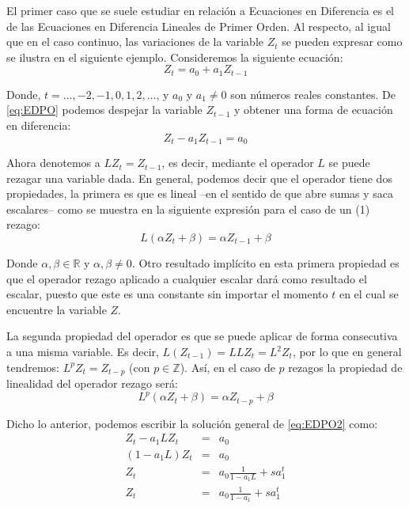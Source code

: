 \documentclass[
]{book}
\begin{document}
El primer caso que se suele estudiar en relación a Ecuaciones en Diferencia es el de las Ecuaciones en Diferencia Lineales de Primer Orden. Al respecto, al igual que en el caso continuo, las variaciones de la variable \(Z_t\) se pueden expresar como se ilustra en el siguiente ejemplo. Consideremos la siguiente ecuación:
\begin{equation}
    Z_t = a_0 + a_1 Z_{t-1}
    \label{eq:EDPO}
\end{equation}

Donde, \(t = \ldots, -2, -1, 0, 1, 2, \ldots\), y \(a_0\) y \(a_1 \neq 0\) son números reales constantes. De \eqref{eq:EDPO} podemos despejar la variable \(Z_{t-1}\) y obtener una forma de ecuación en diferencia:
\begin{equation}
    Z_t - a_1 Z_{t-1} = a_0
    \label{eq:EDPO2}
\end{equation}

Ahora denotemos a \(L Z_t = Z_{t-1}\), es decir, mediante el operador \(L\) se puede rezagar una variable dada. En general, podemos decir que el operador tiene dos propiedades, la primera es que es lineal --en el sentido de que abre sumas y saca escalares-- como se muestra en la siguiente expresión para el caso de un (1) rezago:
\begin{equation}
    L(\alpha Z_{t} + \beta) = \alpha Z_{t-1} + \beta
    \label{eq:E1Lag}
\end{equation}

Donde \(\alpha, \beta \in \mathbb{R}\) y \(\alpha, \beta \neq 0\). Otro resultado implícito en esta primera propiedad es que el operador rezago aplicado a cualquier escalar dará como resultado el escalar, puesto que este es una constante sin importar el momento \(t\) en el cual se encuentre la variable \(Z\).

La segunda propiedad del operador es que se puede aplicar de forma consecutiva a una misma variable. Es decir, \(L ( Z_{t-1}) = L L Z_{t} = L^2 Z_{t}\), por lo que en general tendremos: \(L^p Z_t = Z_{t-p}\) (con \(p \in \mathbb{Z}\)). Así, en el caso de \(p\) rezagos la propiedad de linealidad del operador rezago será:
\begin{equation}
    L^p (\alpha Z_{t} + \beta) = \alpha Z_{t-p} + \beta
   \label{eq:LinProp}
\end{equation}

Dicho lo anterior, podemos escribir la solución general de \eqref{eq:EDPO2} como:
\begin{eqnarray}
    Z_t - a_1 L Z_t & = & a_0 \nonumber \\
    (1 - a_1 L)Z_t & = & a_0 \nonumber \\
    Z_t & = & a_0 \frac{1}{1 - a_1 L} + s a^t_1 \nonumber \\
    Z_t & = & a_0 \frac{1}{1 - a_1} + s a^t_1
    \label{eq:PROC01}
\end{eqnarray}
\end{document}
